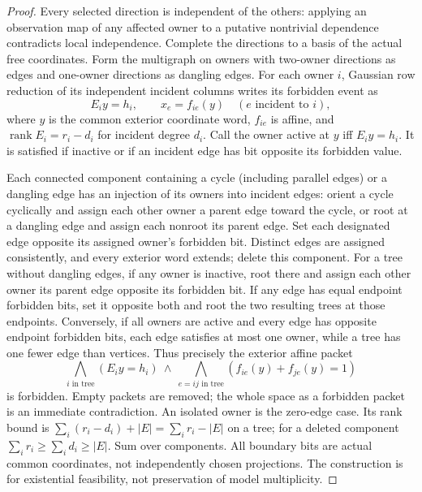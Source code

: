 \documentclass[11pt]{article}
\begin{document}
\begin{proof}
Every selected direction is independent of the others: applying an observation map of any affected owner to a putative nontrivial dependence contradicts local independence. Complete the directions to a basis of the actual free coordinates. Form the multigraph on owners with two-owner directions as edges and one-owner directions as dangling edges. For each owner $i$, Gaussian row reduction of its independent incident columns writes its forbidden event as
\[
 E_i y=h_i,\qquad x_e=f_{ie}(y)\quad(e\text{ incident to }i),
\]
where $y$ is the common exterior coordinate word, $f_{ie}$ is affine, and $\operatorname{rank}E_i=r_i-d_i$ for incident degree $d_i$. Call the owner active at $y$ iff $E_i y=h_i$. It is satisfied if inactive or if an incident edge has bit opposite its forbidden value.
 
Each connected component containing a cycle (including parallel edges) or a dangling edge has an injection of its owners into incident edges: orient a cycle cyclically and assign each other owner a parent edge toward the cycle, or root at a dangling edge and assign each nonroot its parent edge. Set each designated edge opposite its assigned owner's forbidden bit. Distinct edges are assigned consistently, and every exterior word extends; delete this component. For a tree without dangling edges, if any owner is inactive, root there and assign each other owner its parent edge opposite its forbidden bit. If any edge has equal endpoint forbidden bits, set it opposite both and root the two resulting trees at those endpoints. Conversely, if all owners are active and every edge has opposite endpoint forbidden bits, each edge satisfies at most one owner, while a tree has one fewer edge than vertices. Thus precisely the exterior affine packet
\[
 \bigwedge_{i\text{ in tree}}(E_i y=h_i)
 \ \land\
 \bigwedge_{e=ij\text{ in tree}}(f_{ie}(y)+f_{je}(y)=1)
\]
is forbidden. Empty packets are removed; the whole space as a forbidden packet is an immediate contradiction. An isolated owner is the zero-edge case. Its rank bound is $\sum_i(r_i-d_i)+|E|=\sum_i r_i-|E|$ on a tree; for a deleted component $\sum_i r_i\ge\sum_i d_i\ge |E|$. Sum over components. All boundary bits are actual common coordinates, not independently chosen projections. The construction is for existential feasibility, not preservation of model multiplicity.


\end{proof}
\end{document}

